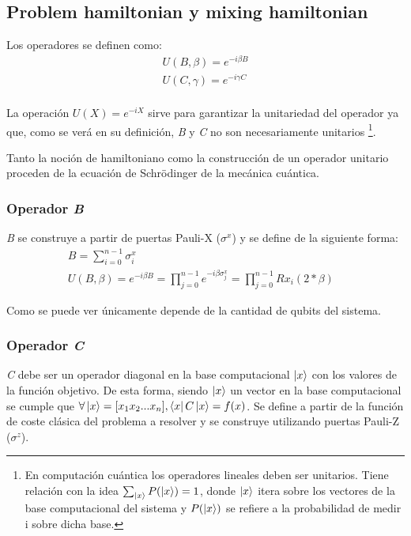 \documentclass{article}
\begin{document}
\subsection{Problem hamiltonian y mixing hamiltonian}

Los operadores se definen como:
\begin{align*}
  U(B, \beta) = e^{-i \beta B} \\
  U(C, \gamma) = e^{-i \gamma C} \\
\end{align*}

La operación \(U(X) = e^{-i X}\) sirve para garantizar la unitariedad del operador ya que, como se verá en su definición, \textit{B} y \textit{C} no son necesariamente unitarios
\footnote{En computación cuántica los operadores lineales deben ser unitarios. Tiene relación con la idea
  $\sum_{\ket{x}} {P(\ket{x})} = 1$,
  donde $\ket{x}$ itera sobre los vectores de la base computacional del sistema y
  \(P(\ket{x})\) se refiere a la probabilidad de medir i sobre dicha base.}.

Tanto la noción de hamiltoniano como la construcción de un operador unitario proceden de la ecuación de Schrödinger de la mecánica cuántica.

\subsubsection{Operador \textit{B}}
\textit{B} se construye a partir de puertas Pauli-X ($\sigma^x$) y se define de la siguiente forma:
\begin{align*}
  &B = \sum_{i=0}^{n-1}\sigma^x_{i} &&\\
  &U(B, \beta) = e^{-i \beta B} = \prod_{j=0}^{n-1}e^{-i \beta \sigma^x_j} = \prod_{j=0}^{n-1}Rx_i(2*\beta)  %
\end{align*}

Como se puede ver únicamente depende de la cantidad de qubits del sistema.

\subsubsection{Operador \textit{C}}
\label{sec:3-operador c}
\textit{C} debe ser un operador diagonal  %
en la base computacional \(\ket{x}\) con los valores de la función objetivo. De esta forma, siendo \(\ket{x}\) un vector en la base computacional se cumple que \(\forall \ket{x} = [x_1x_2...x_n], \bra{x}C\ket{x} = f(x)\). Se define a partir de la función de coste clásica del problema a resolver y se construye utilizando puertas Pauli-Z ($\sigma^z$).
\end{document}
